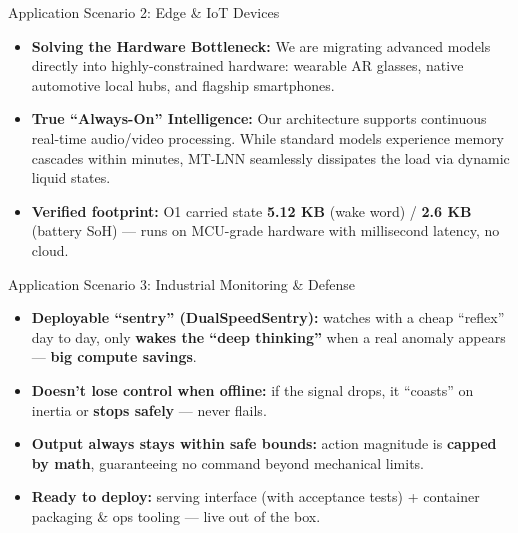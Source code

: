 \documentclass[aspectratio=169, 10pt]{beamer}
\begin{document}
\begin{frame}{Application Scenario 2: Edge \& IoT Devices}
\begin{itemize}
    \item \textbf{Solving the Hardware Bottleneck:} We are migrating advanced models directly into highly-constrained hardware: wearable AR glasses, native automotive local hubs, and flagship smartphones.
    \item \textbf{True ``Always-On'' Intelligence:} Our architecture supports continuous real-time audio/video processing. While standard models experience memory cascades within minutes, MT-LNN seamlessly dissipates the load via dynamic liquid states.
    \item \textbf{Verified footprint:} O1 carried state \textbf{5.12 KB} (wake word) / \textbf{2.6 KB} (battery SoH) --- runs on MCU-grade hardware with millisecond latency, no cloud.
\end{itemize}
\end{frame}

\begin{frame}{Application Scenario 3: Industrial Monitoring \& Defense}
\begin{itemize}
    \item \textbf{Deployable ``sentry'' (DualSpeedSentry):} watches with a cheap ``reflex'' day to day, only \textbf{wakes the ``deep thinking''} when a real anomaly appears --- \textbf{big compute savings}.
    \item \textbf{Doesn't lose control when offline:} if the signal drops, it ``coasts'' on inertia or \textbf{stops safely} --- never flails.
    \item \textbf{Output always stays within safe bounds:} action magnitude is \textbf{capped by math}, guaranteeing no command beyond mechanical limits.
    \item \textbf{Ready to deploy:} serving interface (with acceptance tests) + container packaging \& ops tooling --- live out of the box.
\end{itemize}
\end{frame}
\end{document}
